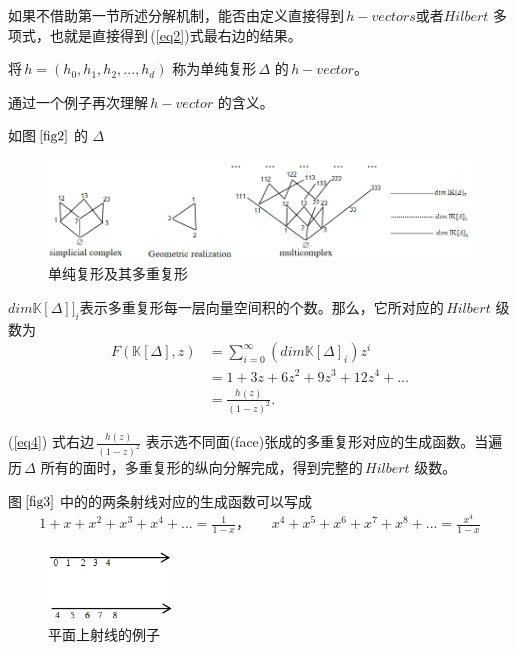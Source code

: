 如果不借助第一节所述分解机制，能否由定义直接得到\,$h-vectors$或者$Hilbert$ 多项式，也就是直接得到\,(\ref{eq2})式最右边的结果。
\begin{df}
将\,$h=(h_{0},h_{1},h_{2},...,h_{d})$ 称为单纯复形\,$\Delta$ 的\,$h-vector$。
\end{df}\label{Ehrhart2}
通过一个例子再次理解\,$h-vector$ 的含义。
\begin{example}
如图$\,\ref{fig2}$ 的 $\Delta$ \par
\begin{figure}[h]
\centering
\includegraphics[width=1.2\textwidth]{tupianer.png}
\caption{单纯复形及其多重复形}
\label{fig2}
\end{figure}
\noindent $dim \mathbb{K}[\Delta]]_{i}$表示多重复形每一层向量空间积的个数。那么，它所对应的\,$Hilbert$ 级数为
\begin{align}
F(\mathbb{K}[\Delta],z)&=\sum_{i=0}^{\infty}(dim\mathbb{K}[\Delta]_{i})z^{i}\nonumber \\[0.5ex]
&=1 + 3z +6 z^{2} + 9 z^{3} + 12 z^{4}+... \nonumber \\[0.5ex]
&=\frac{h(z)}{(1-z)^2}. \label{eq4}
\end{align}
\end{example}
(\ref{eq4}) 式右边\,$\frac{h(z)}{(1-z)^2}$ 表示选不同面(face)张成的多重复形对应的生成函数。当遍历\,$\Delta$ 所有的面时，多重复形的纵向分解完成，得到完整的\,$Hilbert$ 级数。\\

\begin{example}
图$\,\ref{fig3}$ 中的的两条射线对应的生成函数可以写成
\begin{align}
1+x+x^2+x^3+x^4+...=\frac{1}{1-x}，~~~~~~~
x^4+x^5+x^6+x^7+x^8+...=\frac{x^4}{1-x}
\label{eq5}
\end{align} 
\begin{figure}[h]
\centering
\includegraphics[width=0.3\textwidth]{tupiansi.png}
\caption{平面上射线的例子}
\label{fig3}
\end{figure}
\end{example}

